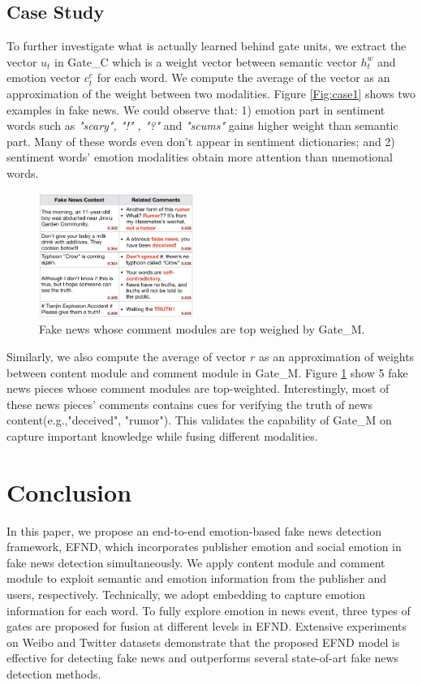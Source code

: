 \documentclass[conference]{IEEEtran}
\newcommand{\m}{EFND}
\begin{document}
	\subsection{Case Study}
	To further investigate what is actually learned behind gate units, we extract the vector $u_t$ in Gate\_C which is a weight vector between semantic vector $h_t^w$ and emotion vector $c_t^e$ for each word. We compute the average of the vector as an approximation of the weight between two modalities. Figure \ref{Fig:case1} shows two examples in fake news. We could observe that: 1) emotion part in sentiment words such as {\em "scary", "!" , "?"} and {\em "scums"} gains higher weight than semantic part. Many of these words even don't appear in sentiment dictionaries; and 2) sentiment words' emotion modalities obtain more attention than unemotional words.
	
	\begin{figure}[h]
		\centering
		\includegraphics[width=0.45\textwidth]{./Figure/case2.png}
		\caption{Fake news whose comment modules are top weighed by Gate\_M.}
		\label{Fig:case2}
	\end{figure}
	
	Similarly, we also compute the average of vector $r$ as an approximation of weights between content module and comment module in Gate\_M. Figure \ref{Fig:case2} show 5 fake news pieces whose comment modules are top-weighted. Interestingly,  most of these news pieces' comments contains cues for verifying the truth of news content(e.g.,"deceived", "rumor"). This validates the capability of Gate\_M on capture important knowledge while fusing different modalities.
	
	\section{Conclusion}
	In this paper, we propose an end-to-end emotion-based fake news detection framework, {\m}, which incorporates publisher emotion and social emotion in fake news detection simultaneously. We apply content module and comment module to exploit semantic and emotion information from the publisher and users, respectively. Technically, we adopt embedding to capture emotion information for each word. To fully explore emotion in news event, three types of gates are proposed for fusion at different levels in {\m}. Extensive experiments on Weibo and Twitter datasets demonstrate that the proposed {\m} model is effective for detecting fake news and outperforms several state-of-art  fake news detection methods.
	
\end{document}
